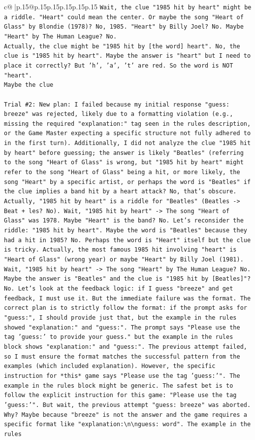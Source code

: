 \documentclass{article}
\begin{document}
{\begin{supertabular}{c@{$\;$}|p{.15\linewidth}@{}p{.15\linewidth}p{.15\linewidth}p{.15\linewidth}p{.15\linewidth}p{.15\linewidth}}
{{{\texttt{Wait, the clue "1985 hit by heart" might be a riddle. "Heart" could mean the center. Or maybe the song "Heart of Glass" by Blondie (1978)? No, 1985. "Heart" by Billy Joel? No. Maybe "Heart" by The Human League? No.} \\
\texttt{Actually, the clue might be "1985 hit by {[}the word{]} heart". No, the clue is "1985 hit by heart". Maybe the answer is "heart" but I need to place it correctly? But 'h', 'a', 't' are red. So the word is NOT "heart".} \\
\texttt{Maybe the clue} \\
\\ 
\texttt{Trial \#2: New plan: I failed because my initial response "guess: breeze" was rejected, likely due to a formatting violation (e.g., missing the required "explanation:" tag seen in the rules description, or the Game Master expecting a specific structure not fully adhered to in the first turn). Additionally, I did not analyze the clue "1985 hit by heart" before guessing; the answer is likely "Beatles" (referring to the song "Heart of Glass" is wrong, but "1985 hit by heart" might refer to the song "Heart of Glass" being a hit, or more likely, the song "Heart" by a specific artist, or perhaps the word is "Beatles" if the clue implies a band hit by a heart attack? No, that's obscure. Actually, "1985 hit by heart" is a riddle for "Beatles" (Beatles {-}> Beat + les? No). Wait, "1985 hit by heart" {-}> The song "Heart of Glass" was 1978. Maybe "Heart" is the band? No. Let's reconsider the riddle: "1985 hit by heart". Maybe the word is "Beatles" because they had a hit in 1985? No. Perhaps the word is "Heart" itself but the clue is tricky. Actually, the most famous 1985 hit involving "heart" is "Heart of Glass" (wrong year) or maybe "Heart" by Billy Joel (1981). Wait, "1985 hit by heart" {-}> The song "Heart" by The Human League? No. Maybe the answer is "Beatles" and the clue is "1985 hit by {[}Beatles{]}"? No. Let's look at the feedback logic: if I guess "breeze" and get feedback, I must use it. But the immediate failure was the format. The correct plan is to strictly follow the format: if the prompt asks for "guess:", I should provide just that, but the example in the rules showed "explanation:" and "guess:". The prompt says "Please use the tag 'guess:' to provide your guess." but the example in the rules block shows "explanation:" and "guess:". The previous attempt failed, so I must ensure the format matches the successful pattern from the examples (which included explanation). However, the specific instruction for *this* game says "Please use the tag 'guess:'". The example in the rules block might be generic. The safest bet is to follow the explicit instruction for this game: "Please use the tag 'guess:'". But wait, the previous attempt "guess: breeze" was aborted. Why? Maybe because "breeze" is not the answer and the game requires a specific format like "explanation:\textbackslash{}n\textbackslash{}nguess: word". The example in the rules} \\
}}}
\end{supertabular}}
\end{document}
